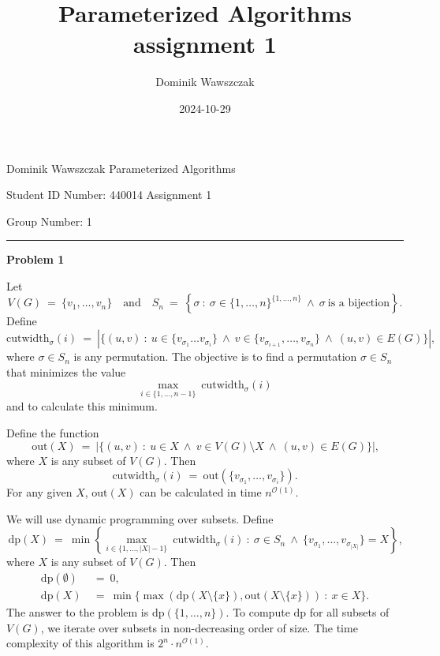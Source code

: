 \documentclass[12pt]{article}
\title{Parameterized Algorithms assignment 1}
\author{Dominik Wawszczak}
\date{2024-10-29}
\begin{document}
	\setlength{\parindent}{0 cm}
	
	Dominik Wawszczak \hfill Parameterized Algorithms
	
	Student ID Number: 440014 \hfill Assignment 1
	
	Group Number: 1
	
	\bigskip
	\hrule
	\bigskip
	
	\textbf{Problem 1}
	
	\medskip
	
	Let
	\[ V(G) \ = \ \{v_{1}, \ldots, v_{n}\} \quad \text{and} \quad S_{n} \ = \
	\left\{ \sigma \ : \ \sigma \in \{1, \ldots, n\}^{\{1, \ldots, n\}} \ \wedge
	\ \sigma \ \text{is a bijection} \right\} \text{.} \]
	Define
	\[ \text{cutwidth}_{\sigma}(i) \ = \ |\{(u, v) \ : \ u \in \{v_{\sigma_{1}}
	\ldots v_{\sigma_{i}}\} \ \wedge \ v \in \{v_{\sigma_{i + 1}}, \ldots,
	v_{\sigma_{n}}\} \ \wedge \ (u, v) \in E(G)\}| \text{,} \]
	where \(\sigma \in S_{n}\) is any permutation. The objective is to find a
	permutation \(\sigma \in S_{n}\) that minimizes the value
	\[ \underset{i \in \{1, \ldots, n - 1\}}{\max} \
	\text{cutwidth}_{\sigma}(i) \]
	and to calculate this minimum.
	
	\medskip
	
	Define the function
	\[ \text{out}(X) \ = \ |\{(u, v) \ : \ u \in X \ \wedge \ v \in V(G)
	\setminus X \ \wedge \ (u, v) \in E(G)\}| \text{,} \]
	where \(X\) is any subset of \(V(G)\). Then
	\[ \text{cutwidth}_{\sigma}(i) \ = \ \text{out}(\{v_{\sigma_{1}}, \ldots,
	v_{\sigma_{i}}\}) \text{.} \]
	For any given \(X\), \(\text{out}(X)\) can be calculated in time
	\(n^{\mathcal{O}(1)}\).
	
	\medskip
	
	We will use dynamic programming over subsets. Define
	\[ \text{dp}(X) \ = \ \min \left\{ \underset{i \in
	\{1, \ldots, |X| - 1\}}{\max} \ \text{cutwidth}_{\sigma}(i) \ : \ \sigma \in
	S_{n} \ \wedge \ \{v_{\sigma_{1}}, \ldots, v_{\sigma_{|X|}}\} = X \right\}
	\text{,} \]
	where \(X\) is any subset of \(V(G)\). Then
	\begin{align*}
		\text{dp}(\emptyset) \ &= \ 0 \text{,} \\
		\text{dp}(X) \ &= \ \min \{\max(\text{dp}(X \setminus \{x\}),
		\text{out}(X \setminus \{x\})) \ : \ x \in X\} \text{.}
	\end{align*}
	The answer to the problem is \(\text{dp}(\{1, \ldots, n\})\). To compute
	\(\text{dp}\) for all subsets of \(V(G)\), we iterate over subsets in
	non-decreasing order of size. The time complexity of this algorithm is
	\(2^{n} \cdot n^{\mathcal{O}(1)}\).
	
\end{document}

